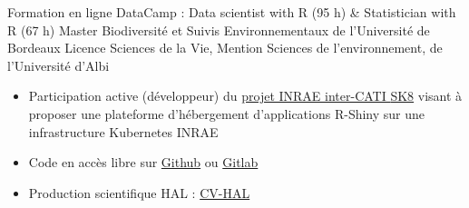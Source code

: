\documentclass[localFont,alternative]{yaac-another-awesome-cv}
\begin{document}

\begin{scholarship}

					{Formation en ligne DataCamp : Data scientist with R (95 h) \& Statistician with R (67 h)}
					{Master Biodiversité et Suivis Environnementaux de l'Université de Bordeaux}
					{Licence Sciences de la Vie, Mention Sciences de l'environnement, de l'Université d'Albi}
\end{scholarship}


\begin{itemize}
\vspace{+1em}
\item Participation active (développeur) du \href{https://sk8.inrae.fr}{projet INRAE inter-CATI \textcolor{symbolcolor}{SK8}} visant à proposer une plateforme d'hébergement d'applications R-Shiny sur une infrastructure Kubernetes INRAE \\
\item Code en accès libre sur \href{https://github.com/davidcarayon}{\textcolor{symbolcolor}{Github}} ou \href{https://gitlab.irstea.fr/david.carayon}{\textcolor{symbolcolor}{Gitlab}} \\

\item Production scientifique HAL : \href{https://cv.hal.science/david-carayon}{\textcolor{symbolcolor}{CV-HAL}}\\

\end{itemize}
\end{document}
